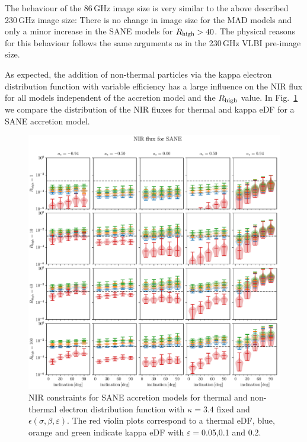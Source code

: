 
The behaviour of the 86\,GHz image size is very similar to the above described 230\,GHz image size: There is no change in image size for the MAD models and only a minor increase in the SANE models for $R_\mathrm{high}>40$. The physical reasons for this behaviour follows the same arguments as in the 230\,GHz VLBI pre-image size.

As expected, the addition of non-thermal particles via the kappa electron distribution function with variable efficiency has a large influence on the NIR flux for all models independent of the accretion model and the $R_\mathrm{high}$ value. In Fig.~\ref{fig:NIR_kappaepsilon} we compare the distribution of the NIR fluxes for thermal and kappa eDF for a SANE accretion model.

\begin{figure}
  \centering
  \includegraphics[width=\columnwidth]{./figures/SANE_NIR_standard.pdf}
  \caption{NIR constraints for SANE accretion models for thermal and non-thermal electron distribution function with $\kappa=3.4$ fixed and $\epsilon\left(\sigma,\beta,\varepsilon\right)$. The red violin plots correspond to a thermal eDF, blue, orange and green indicate kappa eDF with $\varepsilon=$0.05,0.1 and 0.2.}
  \label{fig:NIR_kappaepsilon}
\end{figure}


